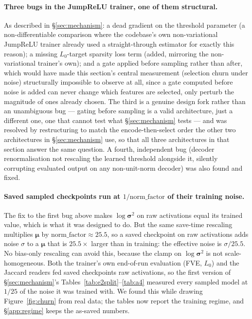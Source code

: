 \documentclass[11pt]{article}
\begin{document}
\paragraph{Three bugs in the JumpReLU trainer, one of them structural.} As
described in \S\ref{sec:mechanism}: a dead gradient on the threshold
parameter (a non-differentiable comparison where the codebase's own
non-variational JumpReLU trainer already used a straight-through estimator
for exactly this reason); a missing $L_0$-target sparsity loss term (added,
mirroring the non-variational trainer's own); and a gate applied before
sampling rather than after, which would have made this section's central
measurement (selection churn under noise) structurally impossible to observe
at all, since a gate computed before noise is added can never change which
features are selected, only perturb the magnitude of ones already chosen.
The third is a genuine design fork rather than an unambiguous bug --- gating
before sampling is a valid architecture, just a different one, one that
cannot test what \S\ref{sec:mechanism} tests --- and was resolved by
restructuring to match the encode-then-select order the other two
architectures in \S\ref{sec:mechanism} use, so that all three architectures
in that section answer the same question. A fourth, independent bug (decoder
renormalisation not rescaling the learned threshold alongside it, silently
corrupting evaluated output on any non-unit-norm decoder) was also found and
fixed.

\paragraph{Saved sampled checkpoints run at $1/\mathrm{norm\_factor}$ of their
training noise.} The fix to the first bug above makes $\log\boldsymbol{\sigma}^2$
on raw activations equal its trained value, which is what it was designed to
do. But the same save-time rescaling multiplies $\boldsymbol{\mu}$ by
$\mathrm{norm\_factor}\approx25.5$, so a saved checkpoint on raw activations
adds noise $\sigma$ to a $\boldsymbol{\mu}$ that is $25.5\times$ larger than in
training: the effective noise is $\sigma/25.5$. No bias-only rescaling can
avoid this, because the clamp on $\log\boldsymbol{\sigma}^2$ is not
scale-homogeneous. Both the trainer's own end-of-run evaluation (FVE, $L_0$)
and the Jaccard readers fed saved checkpoints raw activations, so the first
version of \S\ref{sec:mechanism}'s Tables~\ref{tab:e2split}--\ref{tab:a4}
measured every sampled model at $1/25$ of the noise it was trained with. We
found this while drawing Figure~\ref{fig:churn} from real data; the tables
now report the training regime, and \S\ref{app:regime} keeps the as-saved
numbers.
\end{document}
